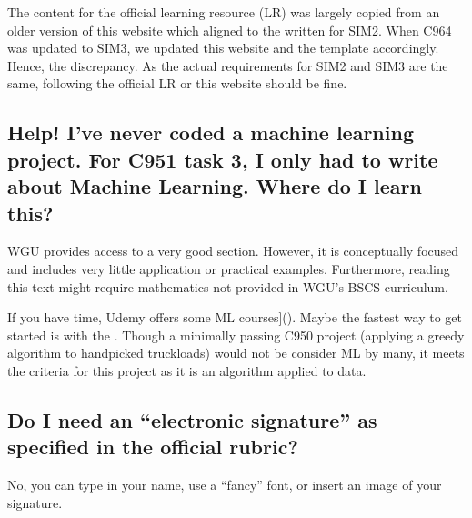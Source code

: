 \documentclass[letterpaper,10pt,english]{jupyterBook}
\begin{document}
\sphinxAtStartPar
The content for the official learning resource (LR) was largely copied from an older version of this website which aligned to the  written for SIM2. When C964 was updated to SIM3, we updated this website and the template accordingly. Hence, the discrepancy. As the actual requirements for SIM2 and SIM3 are the same, following the official LR or this website should be fine.


\subsection{Help! I’ve never coded a machine learning project. For C951 task 3, I only had to write about Machine Learning. Where do I learn this?}
\label{\detokenize{task1:help-i-ve-never-coded-a-machine-learning-project-for-c951-task-3-i-only-had-to-write-about-machine-learning-where-do-i-learn-this}}
\sphinxAtStartPar
WGU provides access to a very good  section. However, it is conceptually focused and includes very little application or practical examples. Furthermore, reading this text might require mathematics not provided in WGU’s BSCS curriculum.

\sphinxAtStartPar
If you have time, Udemy offers some ML courses{]}(). Maybe the fastest way to get started is with the . Though a minimally passing C950 project (applying a greedy algorithm to hand\sphinxhyphen{}picked truckloads) would not be consider ML by many, it meets the criteria for this project as it is an algorithm applied to data.


\subsection{Do I need an “electronic signature” as specified in the official rubric?}
\label{\detokenize{task1:do-i-need-an-electronic-signature-as-specified-in-the-official-rubric}}
\sphinxAtStartPar
No, you can type in your name, use a “fancy” font, or insert an image of your signature.
\end{document}

